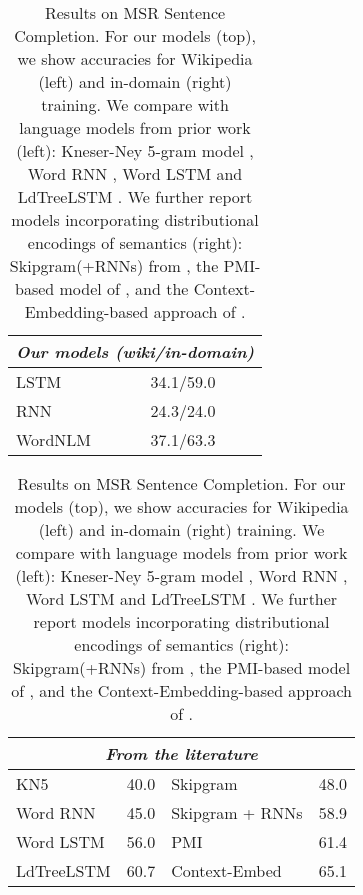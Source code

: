 \begin{table}[t]
  \footnotesize{
    \begin{center}
      \begin{tabular}{l|l}
        \multicolumn{2}{c}{\emph{Our models (wiki/in-domain)}}\\
\hline
        LSTM 	    &      34.1/59.0 \\ %
        RNN  &     24.3/24.0 \\ %
        WordNLM & 37.1/63.3 \\ %
\end{tabular}

\begin{tabular}{l|l||l|l}
  \multicolumn{4}{c}{\emph{From the literature}}\\
  \hline
  KN5   & 40.0            & Skipgram         & 48.0    \\                                
        Word RNN & 45.0         & Skipgram + RNNs  & 58.9 \\                                  
        Word LSTM & 56.0        & PMI &  61.4 \\                      
        LdTreeLSTM  & 60.7     &  Context-Embed & 65.1 \\       \hline
             \end{tabular}
    \end{center}
  }
	\caption{\label{tab:msr-completion-results} Results on MSR Sentence Completion. For our models (top), we show accuracies for  Wikipedia (left) and in-domain (right) training. We compare with language models from prior work (left): Kneser-Ney 5-gram model \cite{Mikolov:2012}, Word RNN \cite{zweig2012computational}, Word LSTM and LdTreeLSTM \cite{zhang2016top}. We further report models incorporating distributional encodings of semantics (right): Skipgram(+RNNs) from , the PMI-based model of \citet{woods2016exploiting}, and the Context-Embedding-based approach of \citet{melamud2016context2vec}.}
\end{table}


